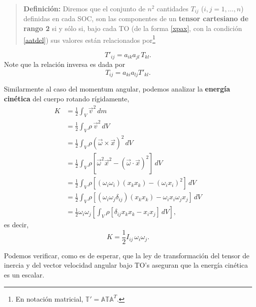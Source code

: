 \begin{quotation}
\textbf{Definición:} Diremos que el conjunto de $n^2$ cantidades $T_{ij}$ ($i,j=1,\dots, n$) definidas en cada SOC, son las componentes de un \textbf{tensor cartesiano de rango 2} si y sólo si, bajo cada TO (de la forma \eqref{xpax}, con la condición \eqref{aatdel}) sus valores están relacionados por\footnote{En notación matricial, $\mathbb{T}'=\mathbb{A}\mathbb{T}\mathbb{A}^T$.} 
\end{quotation}
\begin{equation}\label{dT2}
\boxed{T'_{ij}=a_{ik}a_{jl}\,T_{kl}.}
\end{equation}
Note que la relación inversa es dada por
\begin{equation}
T_{ij}=a_{ki}a_{lj}T'_{kl}.
\end{equation}

Similarmente al caso del momentum angular, podemos analizar la \textbf{energía cinética} del cuerpo rotando rígidamente,
\begin{align}
K &=\frac{1}{2}\int_V \vec{v}^2\,dm \\
&= \frac{1}{2}\int_V \rho\,\vec{v}^2\,dV \\
&= \frac{1}{2}\int_V \rho\left(\vec{\omega}\times\vec{x}\right)^2\,dV \\
&= \frac{1}{2}\int_V \rho\left[\vec{\omega}^2\vec{x}^2-(\vec{\omega}\cdot\vec{x})^2\right]\,dV \\
&= \frac{1}{2}\int_V\rho \left[(\omega_i\omega_i)(x_kx_k)-(\omega_ix_i)^2\right]\,dV \\
&= \frac{1}{2}\int_V\rho \left[(\omega_i\omega_j\delta_{ij})(x_kx_k)-\omega_ix_i\omega_jx_j\right]\,dV \\
&= \frac{1}{2}\omega_i\omega_j\left[\int_V\rho \left[\delta_{ij}x_kx_k-x_ix_j\right]\,dV\right] ,
\end{align}
es decir,
\begin{equation}
\boxed{K=\frac{1}{2}I_{ij}\,\omega_i\omega_j.}
\end{equation}

Podemos verificar, como es de esperar, que la ley de transformación del tensor de inercia y del vector velocidad angular bajo TO's aseguran que la energía cinética es un escalar.

